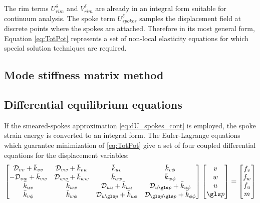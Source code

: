 \documentclass[\rootdir/thesis.tex]{subfiles}
\begin{document}
The rim terms $U_{rim}^{\delta}$ and $V_{rim}^{\delta}$ are already in an integral form suitable for continuum analysis. The spoke term $U_{spokes}^{\delta}$ samples the displacement field at discrete points where the spokes are attached. Therefore in its most general form, Equation \eqref{eq:TotPot} represents a set of non-local elasticity equations for which special solution techniques are required.

\subsection{Mode stiffness matrix method}
\label{sec:ModeMatrix}


\subsection{Differential equilibrium equations}

If the smeared-spokes approximation \eqref{eq:dU_spokes_cont} is employed, the spoke strain energy is converted to an integral form. The Euler-Lagrange equations which guarantee minimization of \eqref{eq:TotPot} give a set of four coupled differential equations for the displacement variables:
\begin{equation}
\label{eq:EulerLagrange}
\begin{bmatrix}
 \D_{vv} + \kvv & \D_{vw} + \kvw & \kuv              & \kvp\\
-\D_{vw} + \kvw & \D_{ww} + \kww & \kuw              & \kwp\\
\kuv            & \kuw           & \D_{uu} + \kuu    & \D_{u\p} + \kup\\
\kvp            & \kwp           & \D_{u\p} + \kup & \D_{\p\p} + \kpp
\end{bmatrix}
\begin{bmatrix}
v\\w\\u\\\p
\end{bmatrix}=
\begin{bmatrix}
f_v\\f_w\\f_u\\m
\end{bmatrix}
\end{equation}
\end{document}

